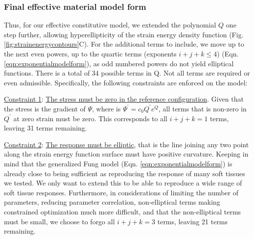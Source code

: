 \subsubsection{Final effective material model form} \label{sec:finalform}

	Thus, for our effective constitutive model, we extended the polynomial $Q$ one step further, allowing hyperellipticity of the strain energy density function (Fig. \ref{fig:strainenergycontours}C). For the additional terms to include, we move up to the next even powers, up to the quartic terms (exponents $i+j+k\leq4$) (Eqn. \ref{eqn:exponentialmodelform}), as odd numbered powers do not yield elliptical functions. 
There is a total of 34 possible terms in Q. Not all terms are required or even admissible. Specifically, the following constraints are enforced on the model:
      
      \underline{Constraint 1}: \underline{The stress must be zero in the reference configuration}. Given that the stress is the gradient of $\Psi$, where is $\Psi^\prime = c_0 Q^\prime e^Q$, all terms that is non-zero in $Q^\prime$ at zero strain must be zero. This corresponds to all $i+j+k = 1$ terms, leaving 31 terms remaining. 
      
      \underline{Constraint 2}: \underline{The response must be elliptic}, that is the line joining any two point along the strain energy function surface must have positive curvature. Keeping in mind that the generalized Fung model (Eqn. \ref{eqn:exponentialmodelform}) is already close to being sufficient as reproducing the response of many soft tissues we tested. We only want to extend this to be able to reproduce a wide range of soft tissue responses. Furthermore, in considerations of limiting the number of parameters, reducing parameter correlation, non-elliptical terms making constrained optimization much more difficult, and that the non-elliptical terms must be small, we choose to forgo all $i+j+k = 3$ terms, leaving 21 terms remaining. 
      
